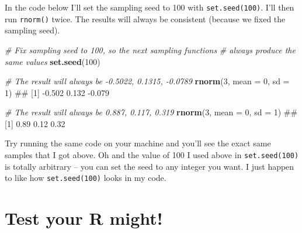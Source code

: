 \documentclass[]{book}
\newenvironment{Shaded}{\begin{snugshade}}{\end{snugshade}}
\newcommand{\KeywordTok}[1]{\textcolor[rgb]{0.13,0.29,0.53}{\textbf{{#1}}}}
\newcommand{\DataTypeTok}[1]{\textcolor[rgb]{0.13,0.29,0.53}{{#1}}}
\newcommand{\DecValTok}[1]{\textcolor[rgb]{0.00,0.00,0.81}{{#1}}}
\newcommand{\CommentTok}[1]{\textcolor[rgb]{0.56,0.35,0.01}{\textit{{#1}}}}
\newcommand{\NormalTok}[1]{{#1}}
\theoremstyle{definition}
\theoremstyle{definition}
\theoremstyle{remark}
\begin{document}
In the code below I'll set the sampling seed to 100 with
\texttt{set.seed(100)}. I'll then run \texttt{rnorm()} twice. The
results will always be consistent (because we fixed the sampling seed).

\begin{Shaded}
\begin{Highlighting}[]
\CommentTok{# Fix sampling seed to 100, so the next sampling functions}
\CommentTok{#   always produce the same values}
\KeywordTok{set.seed}\NormalTok{(}\DecValTok{100}\NormalTok{)}

\CommentTok{# The result will always be -0.5022, 0.1315, -0.0789}
\KeywordTok{rnorm}\NormalTok{(}\DecValTok{3}\NormalTok{, }\DataTypeTok{mean =} \DecValTok{0}\NormalTok{, }\DataTypeTok{sd =} \DecValTok{1}\NormalTok{)}
\NormalTok{## [1] -0.502  0.132 -0.079}

\CommentTok{# The result will always be 0.887, 0.117, 0.319}
\KeywordTok{rnorm}\NormalTok{(}\DecValTok{3}\NormalTok{, }\DataTypeTok{mean =} \DecValTok{0}\NormalTok{, }\DataTypeTok{sd =} \DecValTok{1}\NormalTok{)}
\NormalTok{## [1] 0.89 0.12 0.32}
\end{Highlighting}
\end{Shaded}

Try running the same code on your machine and you'll see the exact same
samples that I got above. Oh and the value of 100 I used above in
\texttt{set.seed(100)} is totally arbitrary -- you can set the seed to
any integer you want. I just happen to like how \texttt{set.seed(100)}
looks in my code.

\section{Test your R might!}\label{test-your-r-might-1}
\end{document}

